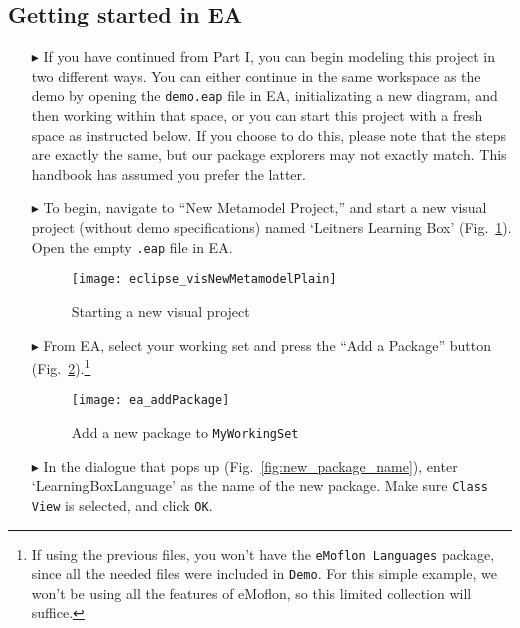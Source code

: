 \subsection{Getting started in EA}
\visHeader
\hypertarget{static:starting vis}{}

\begin{itemize}
\item[$\blacktriangleright$]  If you have continued from Part I, you can begin modeling this project in two different ways. You can either continue in the same
workspace as the demo by opening the \texttt{demo.eap} file in EA, initializating a new diagram, and then working within that space, or you can start this
project with a fresh space as instructed below. If you choose to do this, please note that the steps are exactly the same, but our package explorers may not
exactly match. This handbook has assumed you prefer the latter.

\item[$\blacktriangleright$]  To begin, navigate to ``New Metamodel Project,'' and start a new visual project (without demo specifications) named `Leitners
Learning Box' (Fig.~\ref{fig:new_visModel}). Open the empty \texttt{.eap} file in EA.

\begin{figure}[htbp]
	\centering
  \texttt{[image: eclipse\_visNewMetamodelPlain]}
	\caption{Starting a new visual project}
	\label{fig:new_visModel}
\end{figure}

\newpage

\item[$\blacktriangleright$] From EA, select your working set and press the ``Add a Package'' button (Fig.~\ref{fig:new_package}).\footnote{If using the
previous files, you won't have the \texttt{eMoflon Languages} package, since all the needed files were included in \texttt{Demo}. For this simple example, we won't be
using all the features of eMoflon, so this limited collection will suffice.}

\begin{figure}[htbp]
	\centering
  \texttt{[image: ea\_addPackage]}
	\caption{Add a new package to \texttt{MyWorkingSet}}
	\label{fig:new_package}
	\vspace{0.5cm}
\end{figure}

\vspace{1.0cm}

\item[$\blacktriangleright$] In the dialogue that pops up (Fig.~\ref{fig:new_package_name}), enter `Learning\-Box\-Language' as the name of the new package.
Make sure \texttt{Class View} is selected, and click \texttt{OK}.


\end{itemize}
